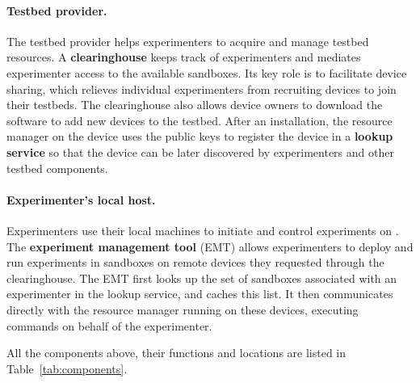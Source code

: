 \paragraph{\fontsize{11.6}{14}\selectfont Testbed provider.}
The testbed provider helps experimenters to acquire and manage testbed
resources. 
%
A \textbf{clearinghouse} keeps track of experimenters and mediates
experimenter access to the available sandboxes. Its key role is to
facilitate device sharing, which relieves individual experimenters
from recruiting devices to join their testbeds. The
clearinghouse also allows device owners to download the \sysname
software to add new devices to the testbed.
%
After an installation, the resource manager on the device uses the public keys
to register the device in a \textbf{lookup service} so that the device
can be later discovered by experimenters and other testbed components.
%

\paragraph{\fontsize{11.6}{14}\selectfont Experimenter's local host.}
Experimenters use their local machines to initiate and control
experiments on \sysname.
%
The \textbf{experiment management tool} (EMT) allows experimenters to
deploy and run experiments in sandboxes on remote devices they
requested through the clearinghouse. The EMT first looks up the set of
sandboxes associated with an experimenter in the lookup service, and
caches this list. It then communicates directly with the resource
manager running on these devices, executing commands on behalf of the
experimenter.

All the components above, their functions and locations are listed in 
Table~\ref{tab:components}.

